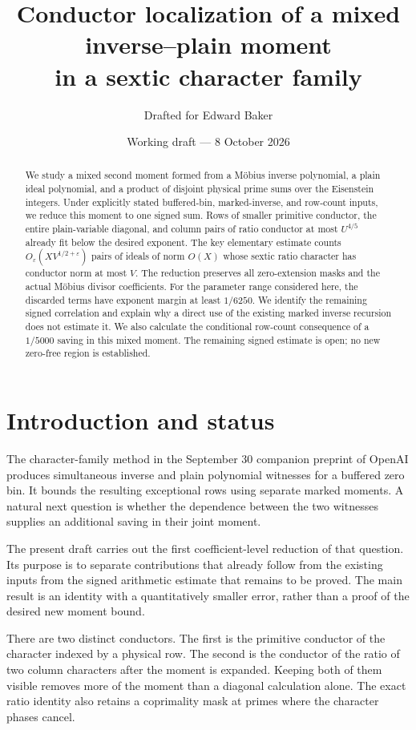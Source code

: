 \documentclass[11pt]{article}
\title{Conductor localization of a mixed inverse--plain moment\\
in a sextic character family}
\author{Drafted for Edward Baker}
\date{Working draft --- 8 October 2026}
\theoremstyle{definition}
\theoremstyle{remark}
\numberwithin{equation}{section}
\newcommand{\ee}{\varepsilon}
\begin{document}
\maketitle
\begin{abstract}
We study a mixed second moment formed from a M\"obius inverse polynomial,
a plain ideal polynomial, and a product of disjoint physical prime sums
over the Eisenstein integers. Under explicitly stated buffered-bin,
marked-inverse, and row-count inputs, we reduce this moment to one signed
sum. Rows of smaller primitive conductor, the entire plain-variable
diagonal, and column pairs of ratio conductor at most $U^{4/5}$ already
fit below the desired exponent. The key elementary estimate counts
$O_\ee(XV^{1/2+\ee})$ pairs of ideals of norm $O(X)$ whose sextic
ratio character has conductor norm at most $V$. The reduction preserves
all zero-extension masks and the actual M\"obius divisor coefficients.
For the parameter range considered here, the discarded terms have
exponent margin at least $1/6250$. We identify the remaining signed
correlation and explain why a direct use of the existing marked inverse
recursion does not estimate it. We also calculate the conditional
row-count consequence of a $1/5000$ saving in this mixed moment.
The remaining signed estimate is open; no new zero-free region is
established.
\end{abstract}

\section{Introduction and status}

The character-family method in the September 30 companion preprint
of OpenAI \cite{openai} produces simultaneous inverse and plain
polynomial witnesses for a buffered zero bin. It bounds the resulting
exceptional rows using separate marked moments. A natural next question
is whether the dependence between the two witnesses supplies an
additional saving in their joint moment.

The present draft carries out the first coefficient-level reduction
of that question. Its purpose is to separate contributions that already
follow from the existing inputs from the signed arithmetic estimate
that remains to be proved. The main result is an identity with a
quantitatively smaller error, rather than a proof of the desired new
moment bound.

There are two distinct conductors. The first is the primitive conductor
of the character indexed by a physical row. The second is the conductor
of the ratio of two column characters after the moment is expanded.
Keeping both of them visible removes more of the moment than a
diagonal calculation alone. The exact ratio identity also retains a
coprimality mask at primes where the character phases cancel.
\end{document}
